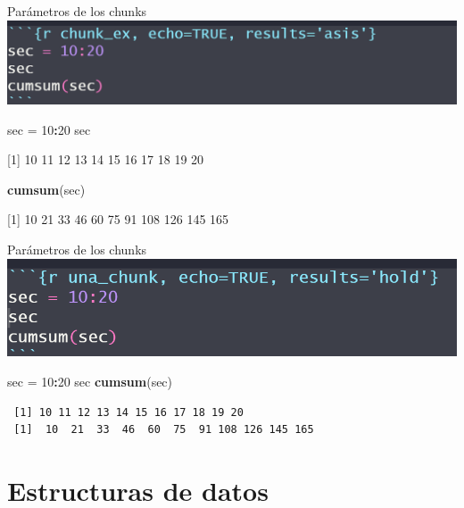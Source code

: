 \documentclass[
  ignorenonframetext,
]{beamer}
\newenvironment{Shaded}{\begin{snugshade}}{\end{snugshade}}
\newcommand{\DecValTok}[1]{\textcolor[rgb]{0.00,0.00,0.81}{#1}}
\newcommand{\FunctionTok}[1]{\textcolor[rgb]{0.13,0.29,0.53}{\textbf{#1}}}
\newcommand{\NormalTok}[1]{#1}
\newcommand{\OtherTok}[1]{\textcolor[rgb]{0.56,0.35,0.01}{#1}}
\newcommand{\SpecialCharTok}[1]{\textcolor[rgb]{0.81,0.36,0.00}{\textbf{#1}}}
\begin{document}
\begin{frame}[fragile]{Parámetros de los chunks}
\label{paruxe1metros-de-los-chunks-9}
\includegraphics[width=0.6\linewidth]{Imgs/parametros_chunk_5}

\begin{Shaded}
\begin{Highlighting}[]
\NormalTok{sec }\OtherTok{=} \DecValTok{10}\SpecialCharTok{:}\DecValTok{20}
\NormalTok{sec}
\end{Highlighting}
\end{Shaded}

{[}1{]} 10 11 12 13 14 15 16 17 18 19 20

\begin{Shaded}
\begin{Highlighting}[]
\FunctionTok{cumsum}\NormalTok{(sec)}
\end{Highlighting}
\end{Shaded}

{[}1{]} 10 21 33 46 60 75 91 108 126 145 165
\end{frame}

\begin{frame}[fragile]{Parámetros de los chunks}
\label{paruxe1metros-de-los-chunks-10}
\includegraphics[width=0.6\linewidth]{Imgs/parametros_chunk_6}

\begin{Shaded}
\begin{Highlighting}[]
\NormalTok{sec }\OtherTok{=} \DecValTok{10}\SpecialCharTok{:}\DecValTok{20}
\NormalTok{sec}
\FunctionTok{cumsum}\NormalTok{(sec)}
\end{Highlighting}
\end{Shaded}

\begin{verbatim}
 [1] 10 11 12 13 14 15 16 17 18 19 20
 [1]  10  21  33  46  60  75  91 108 126 145 165
\end{verbatim}
\end{frame}

\section{Estructuras de datos}\label{estructuras-de-datos}
\end{document}
